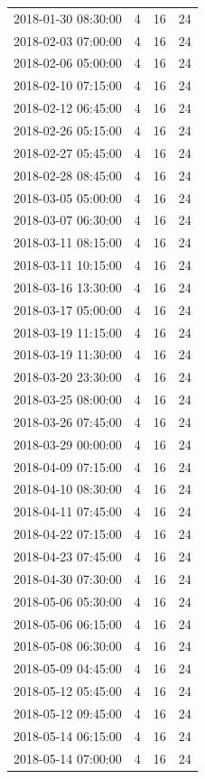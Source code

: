 \begin{tabular}{lrrr}
2018-01-30 08:30:00 & 4 & 16 & 24 \\
2018-02-03 07:00:00 & 4 & 16 & 24 \\
2018-02-06 05:00:00 & 4 & 16 & 24 \\
2018-02-10 07:15:00 & 4 & 16 & 24 \\
2018-02-12 06:45:00 & 4 & 16 & 24 \\
2018-02-26 05:15:00 & 4 & 16 & 24 \\
2018-02-27 05:45:00 & 4 & 16 & 24 \\
2018-02-28 08:45:00 & 4 & 16 & 24 \\
2018-03-05 05:00:00 & 4 & 16 & 24 \\
2018-03-07 06:30:00 & 4 & 16 & 24 \\
2018-03-11 08:15:00 & 4 & 16 & 24 \\
2018-03-11 10:15:00 & 4 & 16 & 24 \\
2018-03-16 13:30:00 & 4 & 16 & 24 \\
2018-03-17 05:00:00 & 4 & 16 & 24 \\
2018-03-19 11:15:00 & 4 & 16 & 24 \\
2018-03-19 11:30:00 & 4 & 16 & 24 \\
2018-03-20 23:30:00 & 4 & 16 & 24 \\
2018-03-25 08:00:00 & 4 & 16 & 24 \\
2018-03-26 07:45:00 & 4 & 16 & 24 \\
2018-03-29 00:00:00 & 4 & 16 & 24 \\
2018-04-09 07:15:00 & 4 & 16 & 24 \\
2018-04-10 08:30:00 & 4 & 16 & 24 \\
2018-04-11 07:45:00 & 4 & 16 & 24 \\
2018-04-22 07:15:00 & 4 & 16 & 24 \\
2018-04-23 07:45:00 & 4 & 16 & 24 \\
2018-04-30 07:30:00 & 4 & 16 & 24 \\
2018-05-06 05:30:00 & 4 & 16 & 24 \\
2018-05-06 06:15:00 & 4 & 16 & 24 \\
2018-05-08 06:30:00 & 4 & 16 & 24 \\
2018-05-09 04:45:00 & 4 & 16 & 24 \\
2018-05-12 05:45:00 & 4 & 16 & 24 \\
2018-05-12 09:45:00 & 4 & 16 & 24 \\
2018-05-14 06:15:00 & 4 & 16 & 24 \\
2018-05-14 07:00:00 & 4 & 16 & 24 \\

\end{tabular}
